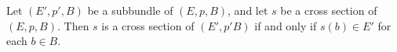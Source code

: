 Let $(E', p', B)$ be a subbundle of $(E, p, B)$, and let $s$ be a cross section of $(E, p, B)$. Then $s$ is a cross section of $(E', p'B)$ if and only if $s(b) \in E'$ for each $b \in B$.
